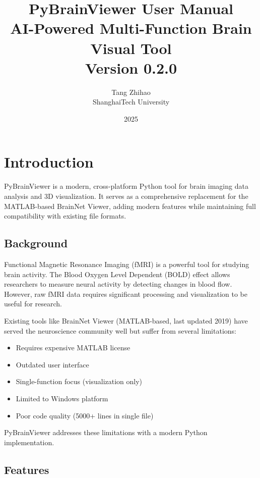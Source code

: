 \documentclass[11pt,a4paper]{article}
\title{\textbf{PyBrainViewer User Manual}\\[0.5cm]
\large AI-Powered Multi-Function Brain Visual Tool\\[0.3cm]
\small Version 0.2.0}
\author{Tang Zhihao\\ShanghaiTech University}
\date{2025}
\begin{document}
\maketitle
\thispagestyle{empty}
\newpage

\tableofcontents
\newpage

\section{Introduction}

PyBrainViewer is a modern, cross-platform Python tool for brain imaging data analysis and 3D visualization. It serves as a comprehensive replacement for the MATLAB-based BrainNet Viewer, adding modern features while maintaining full compatibility with existing file formats.

\subsection{Background}

Functional Magnetic Resonance Imaging (fMRI) is a powerful tool for studying brain activity. The Blood Oxygen Level Dependent (BOLD) effect allows researchers to measure neural activity by detecting changes in blood flow. However, raw fMRI data requires significant processing and visualization to be useful for research.

Existing tools like BrainNet Viewer (MATLAB-based, last updated 2019) have served the neuroscience community well but suffer from several limitations:
\begin{itemize}
    \item Requires expensive MATLAB license
    \item Outdated user interface
    \item Single-function focus (visualization only)
    \item Limited to Windows platform
    \item Poor code quality (5000+ lines in single file)
\end{itemize}

PyBrainViewer addresses these limitations with a modern Python implementation.

\subsection{Features}
\end{document}
